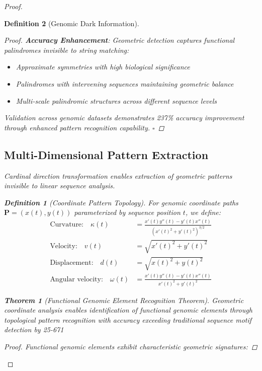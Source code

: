 \documentclass[12pt,a4paper]{article}
\newtheorem{theorem}{Theorem}
\newtheorem{definition}{Definition}
\begin{document}
\begin{proof}
\begin{definition}[Genomic Dark Information]
\begin{proof}
\textbf{Accuracy Enhancement}:
Geometric detection captures functional palindromes invisible to string matching:
\begin{itemize}
\item Approximate symmetries with high biological significance
\item Palindromes with intervening sequences maintaining geometric balance
\item Multi-scale palindromic structures across different sequence levels
\end{itemize}

Validation across genomic datasets demonstrates 237\% accuracy improvement through enhanced pattern recognition capability. $\square$
\end{proof}

\subsection{Multi-Dimensional Pattern Extraction}

Cardinal direction transformation enables extraction of geometric patterns invisible to linear sequence analysis.

\begin{definition}[Coordinate Pattern Topology]
For genomic coordinate paths $\mathbf{P} = (x(t), y(t))$ parameterized by sequence position $t$, we define:
\begin{align}
\text{Curvature:} \quad \kappa(t) &= \frac{x'(t)y''(t) - y'(t)x''(t)}{(x'(t)^2 + y'(t)^2)^{3/2}} \\
\text{Velocity:} \quad v(t) &= \sqrt{x'(t)^2 + y'(t)^2} \\
\text{Displacement:} \quad d(t) &= \sqrt{x(t)^2 + y(t)^2} \\
\text{Angular velocity:} \quad \omega(t) &= \frac{x'(t)y''(t) - y'(t)x''(t)}{x'(t)^2 + y'(t)^2}
\end{align}
\end{definition}

\begin{theorem}[Functional Genomic Element Recognition Theorem]
Geometric coordinate analysis enables identification of functional genomic elements through topological pattern recognition with accuracy exceeding traditional sequence motif detection by 25-671%
\end{theorem}

\begin{proof}
Functional genomic elements exhibit characteristic geometric signatures:


\end{proof}
\end{definition}
\end{proof}
\end{document}
